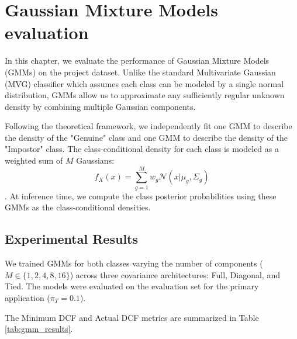 \chapter{Gaussian Mixture Models evaluation}
\label{chap:gmm_evaluation}

In this chapter, we evaluate the performance of Gaussian Mixture Models (GMMs) on the project dataset. Unlike the standard Multivariate Gaussian (MVG) classifier which assumes each class can be modeled by a single normal distribution, GMMs allow us to approximate any sufficiently regular unknown density by combining multiple Gaussian components.

Following the theoretical framework, we independently fit one GMM to describe the density of the "Genuine" class and one GMM to describe the density of the "Impostor" class. The class-conditional density for each class is modeled as a weighted sum of $M$ Gaussians:
\begin{equation}
    f_X(x) = \sum_{g=1}^M w_g \mathcal{N}(x | \mu_g, \Sigma_g)
\end{equation}
. At inference time, we compute the class posterior probabilities using these GMMs as the class-conditional densities.

\section{Experimental Results}

We trained GMMs for both classes varying the number of components ($M \in \{1, 2, 4, 8, 16\}$) across three covariance architectures: Full, Diagonal, and Tied. The models were evaluated on the evaluation set for the primary application ($\pi_T = 0.1$). 

The Minimum DCF and Actual DCF metrics are summarized in Table \ref{tab:gmm_results}.

\begin{table}[H]
    \centering
    \caption{GMM performance (minDCF / actDCF) for $\pi_T = 0.1$}
    \label{tab:gmm_results}
\end{table}

